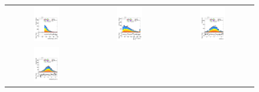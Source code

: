 \begin{figure}[htbp]
  \centering
  \setlength{\tabcolsep}{1.5pt}
  \renewcommand{\arraystretch}{0}

  \begin{tabular}{@{}c c c@{}}
    \includegraphics[width=0.33\textwidth]{images/plots_modelling_run2_run3_variables/run_3_tth/plot_tau_1_pt_hh_tth_22_23_24.pdf} &
    \includegraphics[width=0.33\textwidth]{images/plots_modelling_run2_run3_variables/run_3_tth/plot_SumPtBjet_hh_tth_22_23_24.pdf} &
    \includegraphics[width=0.33\textwidth]{images/plots_modelling_run2_run3_variables/run_3_tth/plot_tau_0_eta_hh_tth_22_23_24.pdf} \\[4pt]
    \includegraphics[width=0.33\textwidth]{images/plots_modelling_run2_run3_variables/run_3_tth/plot_jet_1_eta_hh_tth_22_23_24.pdf} &

\end{tabular}
\end{figure}
